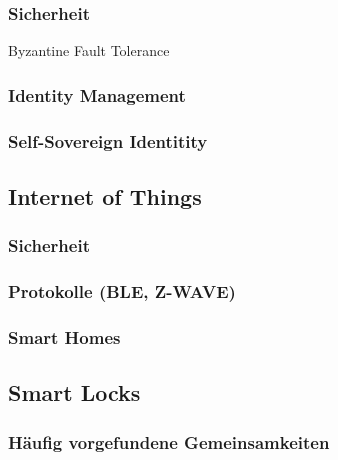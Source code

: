     \begin{figure}[H]
    \end{figure}
    
    
    \subsubsection{Sicherheit}
    \label{sec:blockchain_security}
    Byzantine Fault Tolerance
    
    \subsubsection{Identity Management}
    \label{sec:blockchain_identitymgmnt}
    \subsubsection{Self-Sovereign Identitity}
    \label{sec:blockchain_sovreign}

\subsection{Internet of Things}
    \subsubsection{Sicherheit}
    \subsubsection{Protokolle (BLE, Z-WAVE)}
    \subsubsection{Smart Homes}

\subsection{Smart Locks}
    \subsubsection{Häufig vorgefundene Gemeinsamkeiten}



